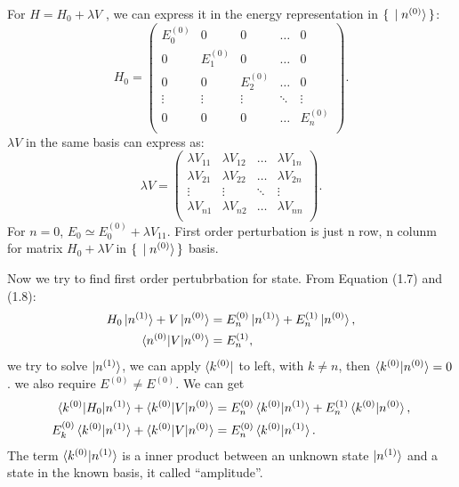 \documentclass[11pt,a4paper]{report}
\begin{document}
For $H=H_0+\lambda V$ , we can express it in the energy representation in $\set{\ket{n^{(0)}}}$:
\[ H_0 = 
\begin{pmatrix}
     E^{(0)}_0& 0         & 0         & \ldots    & 0         \\
     0        & E^{(0)}_1 & 0         & \ldots    & 0         \\
     0        & 0         & E^{(0)}_2 & \ldots    & 0         \\
     \vdots   & \vdots    & \vdots    & \ddots    & \vdots    \\
     0        & 0         & 0         & \ldots    & E^{(0)}_n \\
\end{pmatrix} . \]
$\lambda V$ in the same basis can express as:
\[ \lambda V = 
\begin{pmatrix}
    \lambda V_{11} & \lambda V_{12} & \ldots & \lambda V_{1n} \\
    \lambda V_{21} & \lambda V_{22} & \ldots & \lambda V_{2n} \\
    \vdots         & \vdots         & \ddots & \vdots         \\
    \lambda V_{n1} & \lambda V_{n2} & \ldots & \lambda V_{nn} \\
\end{pmatrix} . \]
For $n=0$, $E_0\simeq E^{(0)}_0+\lambda V_{11}$. First order perturbation is just n row, n colunm for matrix $H_0+\lambda V$ in $\set{\ket{n^{(0)}}}$ basis.

Now we try to find first order pertubrbation for state. From Equation (1.7) and (1.8):
\begin{equation*}
    \begin{aligned}
        H_0\ket{n^{(1)}}+V\ket{n^{(0)}}&=E^{(0)}_n\ket{n^{(1)}}+E^{(1)}_n\ket{n^{(0)}} , \\
        \braket{n^{(0)}|V|n^{(0)}}&=E^{(1)}_n ,
    \end{aligned}
\end{equation*}
we try to solve $\ket{n^{(1)}}$, we can apply $\bra{k^{(0)}}$ to left, with $k\neq n$, then $\braket{k^{(0)}|n^{(0)}}=0$. we also require $E^{(0)}\neq E^{(0)}$. We can get 
\begin{equation} 
    \begin{aligned}
    \braket{k^{(0)}|H_0|n^{(1)}}+\braket{k^{(0)}|V|n^{(0)}}&=E^{(0)}_n\braket{k^{(0)}|n^{(1)}}+E^{(1)}_n\braket{k^{(0)}|n^{(0)}} , \\
    E^{(0)}_k\braket{ k^{(0)} | n^{(1)} }+\braket{k^{(0)}|V|n^{(0)}}&=E^{(0)}_n\braket{k^{(0)} | n^{(1)}} . 
    \end{aligned}
\end{equation}
The term $\braket{k^{(0)} | n^{(1)}}$ is a inner product between an unknown state $\ket{n^{(1)}}$ and a state in the known basis, it called ``amplitude''.
\end{document}
